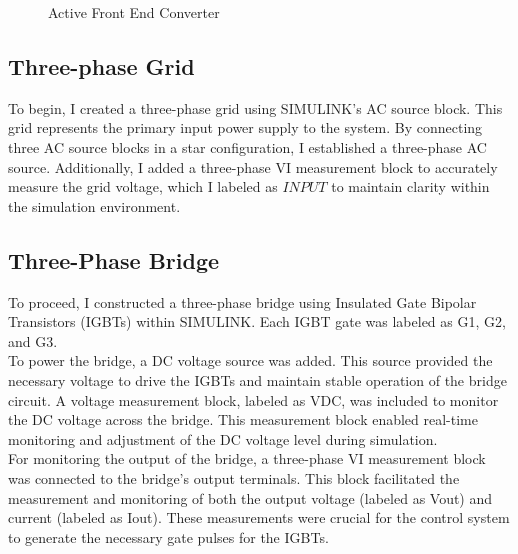 \begin{figure}[ht]
{
    }
    \caption{Active Front End Converter}
    \label{fig:FEC}
\end{figure}

\subsection{Three-phase Grid}
To begin, I created a three-phase grid using SIMULINK's AC source block. This
grid represents the primary input power supply to the system. By connecting
three AC source blocks in a star configuration, I established a three-phase AC
source. Additionally, I added a three-phase VI measurement block to accurately
measure the grid voltage, which I labeled as $INPUT$ to maintain clarity within
the simulation environment.

\subsection{Three-Phase Bridge}

To proceed, I constructed a three-phase bridge using Insulated Gate Bipolar
Transistors (IGBTs) within SIMULINK. Each IGBT gate was labeled as G1, G2, and
G3.\\

To power the bridge, a DC voltage source was added. This source provided the
necessary voltage to drive the IGBTs and maintain stable operation of the
bridge circuit. A voltage measurement block, labeled as VDC, was included to
monitor the DC voltage across the bridge. This measurement block enabled
real-time monitoring and adjustment of the DC voltage level during
simulation.\\

For monitoring the output of the bridge, a three-phase VI measurement block was
connected to the bridge's output terminals. This block facilitated the
measurement and monitoring of both the output voltage (labeled as Vout) and
current (labeled as Iout). These measurements were crucial for the control
system to generate the necessary gate pulses for the IGBTs.

